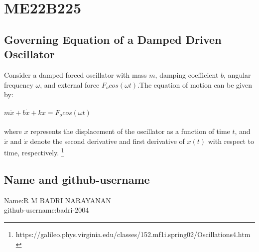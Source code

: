 \documentclass{article}
\begin{document}
\section{ME22B225}
\subsection{Governing Equation of a Damped Driven Oscillator}
Consider a damped forced oscillator with mass $m$, damping coefficient $b$, angular frequency $\omega$, and external force \(F_ocos(\omega t)\).The equation of motion can be given by:\\\\
\textsc{\Large  \(m\ddot{x} + b\dot{x} + kx = F_ocos(\omega t)\)}\\\\

where $x$ represents the displacement of the oscillator as a function of time $t$, and $\ddot{x}$ and $\dot{x}$ denote the second derivative and first derivative of $x(t)$ with respect to time, respectively.
\footnote{https://galileo.phys.virginia.edu/classes/152.mf1i.spring02/Oscillations4.htm}
\subsection{Name and github-username }
Name:R M BADRI NARAYANAN\\
github-username:badri-2004
\end{document}
